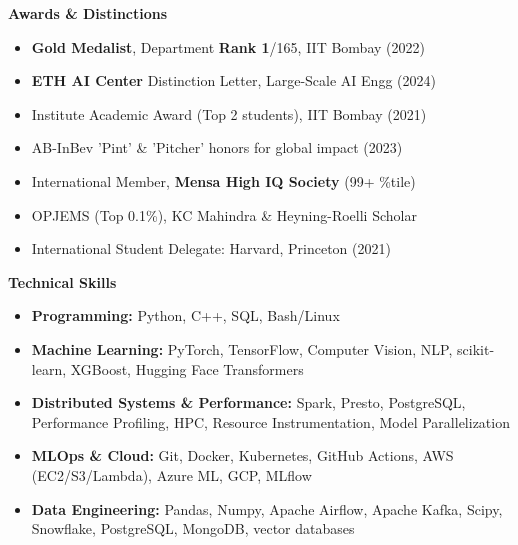 \documentclass[letterpaper,10pt]{article}
\begin{document}
\titlerule
\vspace{4pt}
{\small
\begin{multicols}{2}

{\scshape\raggedright\large\bfseries Awards \& Distinctions}

\begin{itemize}[leftmargin=0.15in, itemsep=-2pt]
  \item \textbf{Gold Medalist}, Department \textbf{Rank 1}/165, IIT Bombay (2022)
  \item \textbf{ETH AI Center} Distinction Letter, Large-Scale AI Engg (2024)
  \item Institute Academic Award (Top 2 students), IIT Bombay (2021)
  \item AB-InBev 'Pint' \& 'Pitcher' honors for global impact (2023)
  \item International Member, \textbf{Mensa High IQ Society} (99+ \%tile)
  \item OPJEMS (Top 0.1\%), KC Mahindra \& Heyning-Roelli Scholar
  \item International Student Delegate: Harvard, Princeton (2021)
\end{itemize}

\columnbreak

{ \scshape\raggedright\large\bfseries Technical Skills}

\begin{itemize}[leftmargin=0.15in]  
  \item \textbf{Programming:} Python, C++, SQL, Bash/Linux 
  \item \textbf{Machine Learning:} PyTorch, TensorFlow, Computer Vision, NLP, scikit-learn, XGBoost, Hugging Face Transformers
  \item \textbf{Distributed Systems \& Performance:} Spark, Presto, PostgreSQL, Performance Profiling, HPC, Resource Instrumentation, Model Parallelization
  \item \textbf{MLOps \& Cloud:} Git, Docker, Kubernetes, GitHub Actions, AWS (EC2/S3/Lambda), Azure ML, GCP, MLflow
  \item \textbf{Data Engineering:} Pandas, Numpy, Apache Airflow, Apache Kafka, Scipy, Snowflake, PostgreSQL, MongoDB, vector databases
\end{itemize}
\end{multicols}
}

\end{document}

